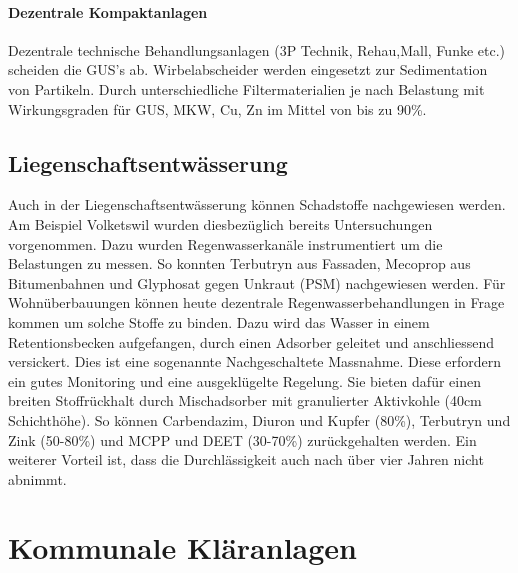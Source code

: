 \documentclass[9pt, openright=false]{scrartcl}
\begin{document}
\paragraph{Dezentrale Kompaktanlagen} Dezentrale technische Behandlungsanlagen (3P Technik, Rehau,Mall, Funke etc.) scheiden die GUS's ab. Wirbelabscheider werden eingesetzt zur Sedimentation von Partikeln. Durch unterschiedliche Filtermaterialien je nach Belastung mit Wirkungsgraden für GUS, MKW, Cu, Zn im Mittel von bis zu 90\%. 
\subsection{Liegenschaftsentwässerung}
Auch in der Liegenschaftsentwässerung können Schadstoffe nachgewiesen werden. Am Beispiel Volketswil wurden diesbezüglich bereits Untersuchungen vorgenommen. Dazu wurden Regenwasserkanäle instrumentiert um die Belastungen zu messen. So konnten Terbutryn aus Fassaden, Mecoprop aus Bitumenbahnen und Glyphosat gegen Unkraut (PSM) nachgewiesen werden. Für Wohnüberbauungen können heute dezentrale Regenwasserbehandlungen in Frage kommen um solche Stoffe zu binden. Dazu wird das Wasser in einem Retentionsbecken aufgefangen, durch einen Adsorber geleitet und anschliessend versickert. Dies ist eine sogenannte Nachgeschaltete Massnahme. Diese erfordern ein gutes Monitoring und eine ausgeklügelte Regelung. Sie bieten dafür einen breiten Stoffrückhalt durch Mischadsorber mit granulierter Aktivkohle (40cm Schichthöhe). So können Carbendazim, Diuron und Kupfer (80\%), Terbutryn und Zink (50-80\%) und MCPP und DEET (30-70\%) zurückgehalten werden. Ein weiterer Vorteil ist, dass die Durchlässigkeit auch nach über vier Jahren nicht abnimmt.
\section{Kommunale Kläranlagen}
\end{document}
